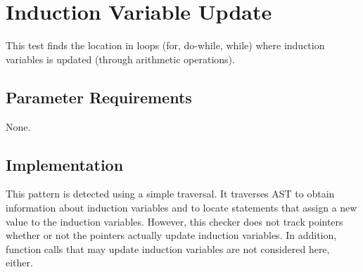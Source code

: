 %
%

\section{Induction Variable Update}
\label{InductionVariableUpdate::overview}

	 This test finds the location in loops (for, do-while, while) where induction variables is updated (through arithmetic operations).

\subsection{Parameter Requirements}

  None. 

\subsection{Implementation}

   This pattern is detected using a simple traversal. It traverses AST to obtain information about induction variables and to locate statements that assign a new value to the induction variables. However, this checker does not track pointers whether or not the pointers actually update induction variables. In addition, function calls that may update induction variables are not considered here, either.


